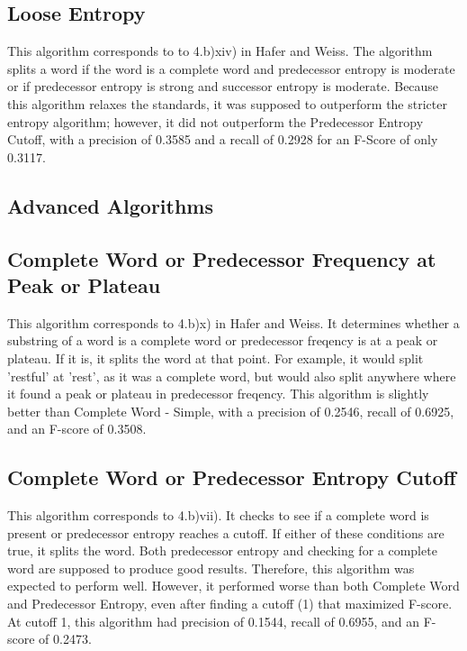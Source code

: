\documentclass[11pt,letterpaper]{article}
\begin{document}
\subsection{Loose Entropy}
  This algorithm corresponds to to 4.b)xiv) in Hafer and Weiss. The algorithm splits a word if the word is a complete word and predecessor entropy is moderate or if predecessor entropy is strong and successor entropy is moderate. Because this algorithm relaxes the standards, it was supposed to outperform the stricter entropy algorithm; however, it did not outperform the Predecessor Entropy Cutoff, with a precision of 0.3585 and a recall of 0.2928 for an F-Score of only 0.3117.
    
\subsection{Advanced Algorithms} 

   
    
\subsection{Complete Word or Predecessor Frequency at Peak or Plateau}
  This algorithm corresponds to 4.b)x) in Hafer and Weiss. It determines whether a substring of a word is a complete word or predecessor freqency is at a peak or plateau. If it is, it splits the word at that point. For example, it would split 'restful' at 'rest', as it was a complete word, but would also split anywhere where it found a peak or plateau in predecessor freqency. This algorithm is slightly better than Complete Word - Simple, with a precision of 0.2546, recall of 0.6925, and an F-score of 0.3508.

\subsection{Complete Word or Predecessor Entropy Cutoff}
  This algorithm corresponds to 4.b)vii). It checks to see if a complete word is present or predecessor entropy reaches a cutoff. If either of these conditions are true, it splits the word. Both predecessor entropy and checking for a complete word are supposed to produce good results. Therefore, this algorithm was expected to perform well. However, it performed worse than both Complete Word and Predecessor Entropy, even after finding a cutoff (1) that maximized F-score. At cutoff 1, this algorithm had precision of 0.1544, recall of 0.6955, and an F-score of 0.2473.
  
\end{document}
